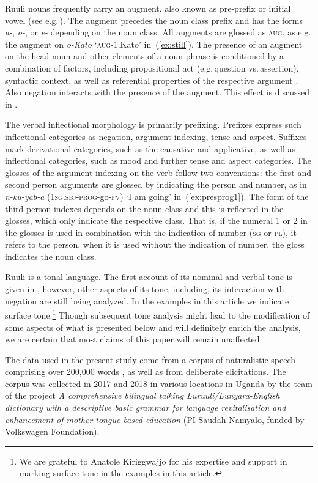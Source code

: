 \documentclass[output=paper,colorlinks,citecolor=brown,draftmode]{langscibook}
\begin{document}
Ruuli nouns frequently carry an augment, also known as pre-prefix or initial vowel (see e.g.\,\citealt[247–255]{VandeVelde2019}). 
The augment precedes the noun class prefix and has the forms \textit{a-}, \textit{o-}, or \textit{e-} depending on the noun class. 
All augments are glossed as \textsc{aug}, as e.g.\,the augment on \textit{o-Kato} `\textsc{aug}-1.Kato' in~(\ref{ex:still}). 
The presence of an augment on the head noun and other elements of a noun phrase is conditioned by a combination of factors, including propositional act  (e.g.\,question vs.\,assertion), syntactic context, as well as referential properties of the respective argument \citep[cf.][249]{VandeVelde2019}. 
Also negation interacts with the presence of the augment. 
This effect is discussed in .

The verbal inflectional morphology is primarily prefixing. 
Prefixes express such inflectional categories as negation, argument indexing, tense and aspect. 
Suffixes mark derivational categories, such as the causative and applicative, as well as inflectional categories, such as mood and further tense and aspect categories.  
The glosses of the argument indexing on the verb follow two conventions: the first and second person arguments are glossed by indicating the person and number, as in \textit{n-ku-yab-a} (1\textsc{sg.sbj}-\textsc{prog}-go-\textsc{fv}) ‘I am going’ in~(\ref{ex:presprog1}). 
The form of the third person indexes depends on the noun class and this is reflected in the glosses, which only indicate the respective class. 
That is, if the numeral 1 or 2 in the glosses is used in combination with the indication of number (\textsc{sg} or \textsc{pl}), it refers to the person, when it is used without the indication of number, the gloss indicates the noun class. 

Ruuli is a tonal language. 
The first account of its nominal and verbal tone is given in \citet{Kiriggwajjo2022}, however, other aspects of its tone, including, its interaction with negation are still being analyzed. 
In the examples in this article we indicate surface tone.\footnote{We are grateful to Anatole Kiriggwajjo for his expertise and support in marking surface tone in the examples in this article.} 
Though subsequent tone analysis might lead to the modification of some aspects of what is presented below and will definitely enrich the analysis, we are certain that most claims of this paper will remain unaffected.

The data used in the present study come from a corpus of naturalistic speech comprising over 200,000 words \citep[]{Witzlack-Makarevichetal2021Corpus}, as well as from deliberate elicitations.
The corpus was collected in 2017 and 2018 in various locations in Uganda by the team of the project \textit{A comprehensive bilingual talking Luruuli/Lunyara-English dictionary with a descriptive basic grammar for language revitalisation and enhancement of mother-tongue based education} (PI Saudah Namyalo, funded by Volkswagen Foundation).
\end{document}
